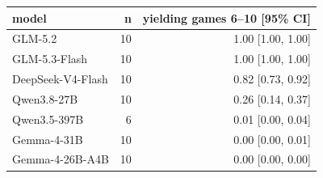 \begin{tabular}{lrr}
\toprule
\textbf{model} & \textbf{n} & \textbf{yielding games 6--10 [95\% CI]} \\
\midrule
GLM-5.2 & 10 & 1.00 [1.00, 1.00] \\
GLM-5.3-Flash & 10 & 1.00 [1.00, 1.00] \\
DeepSeek-V4-Flash & 10 & 0.82 [0.73, 0.92] \\
Qwen3.8-27B & 10 & 0.26 [0.14, 0.37] \\
Qwen3.5-397B & 6 & 0.01 [0.00, 0.04] \\
Gemma-4-31B & 10 & 0.00 [0.00, 0.01] \\
Gemma-4-26B-A4B & 10 & 0.00 [0.00, 0.00] \\
\bottomrule
\end{tabular}
